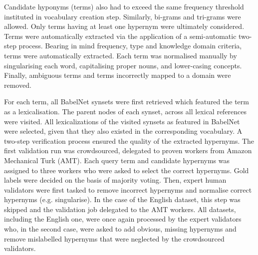 Candidate hyponyms (terms) also had to exceed the same frequency threshold instituted in vocabulary creation step.  Similarly, bi-grams and tri-grams were allowed.  Only terms having at least one hypernym were ultimately considered.  Terms were automatically extracted via the application of a semi-automatic two-step process.  Bearing in mind frequency, type and knowledge domain criteria, terms were automatically extracted.  Each term was normalised manually by singularising each word, capitalising proper nouns, and lower-casing concepts.  Finally, ambiguous terms and terms incorrectly mapped to a domain were removed.

For each term, all BabelNet \citep{navigli2012babelnet} synsets were first retrieved which featured the term as a lexicalisation.  The parent nodes of each synset, across all lexical references were visited.  All lexicalizations of the visited synsets as featured in BabelNet were selected, given that they also existed in the corresponding vocabulary.
A two-step verification process ensured the quality of the extracted hypernyms.  The first validation run was crowdsourced, delegated to proven workers from Amazon Mechanical Turk (AMT).  Each query term and candidate hypernyms was assigned to three workers who were asked to select the correct hypernyms.  Gold labels were decided on the basis of majority voting.  Then, expert human validators were first tasked to remove incorrect hypernyms and normalise correct hypernyms (e.g. singularise).  In the case of the English dataset, this step was skipped and the validation job delegated to the AMT workers.  All datasets, including the English one, were once again processed by the expert validators who, in the second case, were asked to add obvious, missing hypernyms and remove mislabelled hypernyms that were neglected by the crowdsourced validators.

